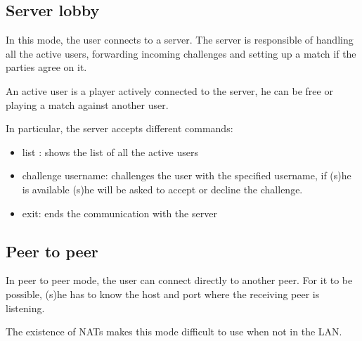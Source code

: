 \subsection{Server lobby}
In this mode, the user connects to a server. The server is responsible of handling all the active users, forwarding incoming challenges and setting up a match if the parties agree on it.


An active user is a player actively connected to the server, he can be free or playing a match against another user.

In particular, the server accepts different commands:
\begin{itemize}
	\item list : shows the list of all the active users
	\item challenge username:  challenges the user with the specified username, if (s)he is available (s)he will be asked to accept or decline the challenge.
	\item exit: ends the communication with the server
\end{itemize}

\subsection{Peer to peer}
In peer to peer mode, the user can connect directly to another peer. For it to be possible, (s)he has to know the host and port where the receiving peer is listening.


The existence of NATs makes this mode difficult to use when not in the LAN.

